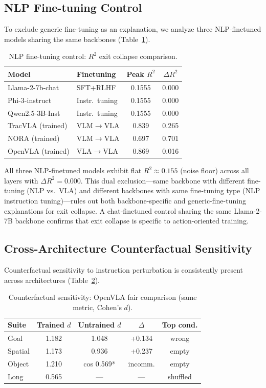 \documentclass[10pt,twocolumn]{article}
\begin{document}
\subsection{NLP Fine-tuning Control}
\label{sec:nlp_control}

To exclude generic fine-tuning as an explanation, we analyze three NLP-finetuned models sharing the same backbones (Table~\ref{tab:nlp}).

\begin{table}[t]
\centering
\caption{NLP fine-tuning control: $R^2$ exit collapse comparison.}
\label{tab:nlp}
\small
\begin{tabular}{llcc}
\toprule
Model & Finetuning & Peak $R^2$ & $\Delta R^2$ \\
\midrule
Llama-2-7b-chat & SFT+RLHF & 0.1555 & 0.000 \\
Phi-3-instruct & Instr.\ tuning & 0.1555 & 0.000 \\
Qwen2.5-3B-Inst & Instr.\ tuning & 0.1555 & 0.000 \\
\midrule
TracVLA (trained) & VLM$\to$VLA & 0.839 & 0.265 \\
NORA (trained) & VLM$\to$VLA & 0.697 & 0.701 \\
OpenVLA (trained) & VLA$\to$VLA & 0.869 & 0.016 \\
\bottomrule
\end{tabular}
\end{table}

All three NLP-finetuned models exhibit flat $R^2 \approx 0.155$ (noise floor) across all layers with $\Delta R^2 = 0.000$.
This dual exclusion---same backbone with different fine-tuning (NLP vs.\ VLA) and different backbones with same fine-tuning type (NLP instruction tuning)---rules out both backbone-specific and generic-fine-tuning explanations for exit collapse.
A chat-finetuned control sharing the same Llama-2-7B backbone confirms that exit collapse is specific to action-oriented training.

\subsection{Cross-Architecture Counterfactual Sensitivity}
\label{sec:cf_cross}

Counterfactual sensitivity to instruction perturbation is consistently present across architectures (Table~\ref{tab:cf_cross}).

\begin{table}[t]
\centering
\caption{Counterfactual sensitivity: OpenVLA fair comparison (same metric, Cohen's $d$).}
\label{tab:cf_cross}
\small
\begin{tabular}{lcccc}
\toprule
Suite & Trained $d$ & Untrained $d$ & $\Delta$ & Top cond. \\
\midrule
Goal & 1.182 & 1.048 & +0.134 & wrong \\
Spatial & 1.173 & 0.936 & +0.237 & empty \\
Object & 1.210 & cos 0.569* & incomm. & empty \\
Long & 0.565 & --- & --- & shuffled \\
\bottomrule
\end{tabular}
\end{table}
\end{document}
